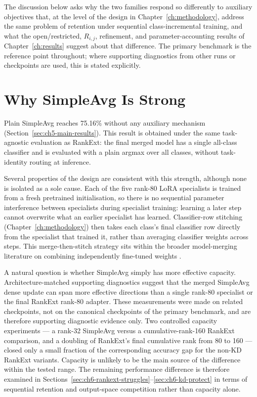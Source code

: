The discussion below asks why the two families respond so differently to
auxiliary objectives that, at the level of the design in
Chapter~\ref{ch:methodology}, address the same problem of retention under
sequential class-incremental training, and what the open/restricted,
$R_{i,j}$, refinement, and parameter-accounting results of
Chapter~\ref{ch:results} suggest about that difference. The primary
benchmark is the reference point throughout; where supporting diagnostics
from other runs or checkpoints are used, this is stated explicitly.

\section{Why SimpleAvg Is Strong}
\label{sec:ch6-simpleavg-strong}

Plain SimpleAvg reaches 75.16\% without any auxiliary mechanism
(Section~\ref{sec:ch5-main-results}). This result is obtained under the
same task-agnostic evaluation as RankExt: the final merged model has a
single all-class classifier and is evaluated with a plain argmax over all
classes, without task-identity routing at inference.

Several properties of the design are consistent with this strength, although
none is isolated as a sole cause. Each of the five rank-80 LoRA specialists
is trained from a fresh pretrained initialisation, so there is no
sequential parameter interference between specialists during specialist
training: learning a later step cannot overwrite what an earlier specialist
has learned. Classifier-row stitching (Chapter~\ref{ch:methodology}) then
takes each class's final classifier row directly from the specialist that
trained it, rather than averaging classifier weights across steps. This
merge-then-stitch strategy sits within the broader model-merging literature
on combining independently fine-tuned weights
\parencite{wortsman2022model,ilharco2023editing}.

A natural question is whether SimpleAvg simply has more effective capacity.
Architecture-matched supporting diagnostics suggest that the merged
SimpleAvg dense update can span more effective directions than a single
rank-80 specialist or the final RankExt rank-80 adapter. These measurements
were made on related checkpoints, not on the canonical checkpoints of the
primary benchmark, and are therefore supporting diagnostic evidence only.
Two controlled capacity experiments --- a rank-32 SimpleAvg versus a
cumulative-rank-160 RankExt comparison, and a doubling of RankExt's final
cumulative rank from 80 to 160 --- closed only a small fraction of the
corresponding accuracy gap for the non-KD RankExt variants. Capacity is
unlikely to be the main source of the difference within the
tested range. The remaining performance difference is therefore examined
in Sections~\ref{sec:ch6-rankext-struggles}--\ref{sec:ch6-kd-protect} in
terms of sequential retention and output-space competition rather than
capacity alone.

